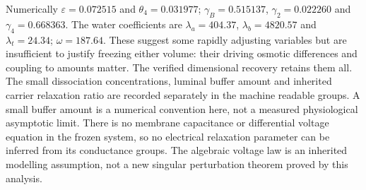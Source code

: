 Numerically $\varepsilon=0.072515$ and $\theta_4=0.031977$;
$\gamma_B=0.515137$, $\gamma_2=0.022260$ and
$\gamma_4=0.668363$.  The water coefficients are
$\lambda_a=404.37$, $\lambda_b=4820.57$ and $\lambda_t=24.34$;
$\omega=187.64$.  These suggest some rapidly adjusting variables but
are insufficient to justify freezing either volume: their driving
osmotic differences and coupling to amounts matter.  The verified
dimensional recovery retains them all.
The small dissociation concentrations, luminal buffer amount and inherited
carrier relaxation ratio are recorded separately in the machine readable
groups.  A small buffer amount is a numerical convention here, not a
measured physiological asymptotic limit.  There is no membrane capacitance
or differential voltage equation in the frozen system, so no electrical
relaxation parameter can be inferred from its conductance groups.  The
algebraic voltage law is an inherited modelling assumption, not a new
singular perturbation theorem proved by this analysis.
